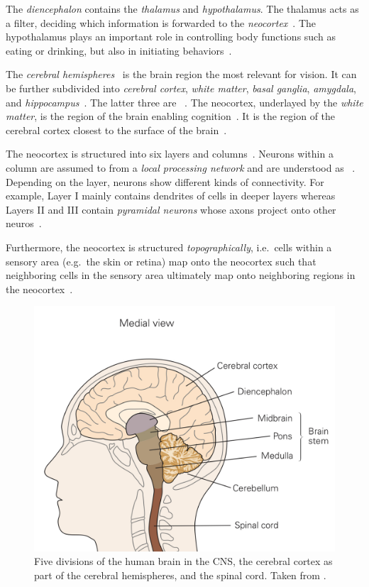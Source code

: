 The \textit{diencephalon} contains the \textit{thalamus} and \textit{hypothalamus}.
The thalamus acts as a filter, deciding which information is forwarded to the \textit{neocortex}~\citep[p. 341]{mack2013principles}.
The hypothalamus plays an important role in controlling body functions such as eating or drinking, but also in initiating behaviors~\citep[p. 341]{mack2013principles}.

The \textit{cerebral hemispheres}~\citep[p. 341]{mack2013principles} is the brain region the most relevant for vision.
It can be further subdivided into \textit{cerebral cortex}, \textit{white matter}, \textit{basal ganglia}, \textit{amygdala}, and \textit{hippocampus}~\citep[p. 341]{mack2013principles}.
The latter three are ~\citep[p. 342]{mack2013principles}.
The neocortex, underlayed by the \textit{white matter}, is the region of the brain enabling cognition~\citep[pp. 341, 392]{mack2013principles}.
It is the region of the cerebral cortex closest to the surface of the brain~\citep[p. 345]{mack2013principles}.

The neocortex is structured into six layers and columns~\citep[p. 345]{mack2013principles}.
Neurons within a column are assumed to from a \textit{local processing network} and are understood as ~\citep[p. 348]{mack2013principles}.
Depending on the layer, neurons show different kinds of connectivity.
For example, Layer I mainly contains dendrites of cells in deeper layers whereas Layers II and III contain \textit{pyramidal neurons} whose axons project onto other neuros~\citep[p. 346]{mack2013principles}.

Furthermore, the neocortex is structured \textit{topographically}, i.e.~cells within a sensory area (e.g.~the skin or retina) map onto the neocortex such that neighboring cells in the sensory area ultimately map onto neighboring regions in the neocortex~\citep[p. 343]{mack2013principles}.

\begin{figure}
    \centering
    \includegraphics[width=.4\textwidth]{images/brain_regions.jpeg}
    \caption[Divisions of the human brain]{Five divisions of the human brain in the \ac{CNS}, the cerebral cortex as part of the cerebral hemispheres, and the spinal cord. Taken from \citet[p. 340]{mack2013principles}.}
    \label{fig:human_brain_divisions}
\end{figure}


